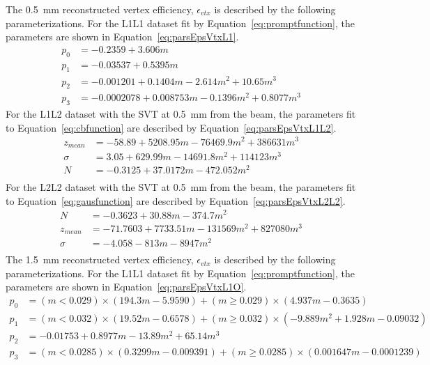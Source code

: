 The 0.5~mm reconstructed vertex efficiency, $\epsilon_{vtx}$ is described by the following parameterizations. For the L1L1 dataset fit by Equation~\eqref{eq:promptfunction}, the parameters are shown in Equation~\ref{eq:parsEpsVtxL1}.
\begin{equation}
\begin{split}
\label{eq:parsEpsVtxL1}
p_0 &= -0.2359+3.606m\\
p_1 &= -0.03537+0.5395m \\
p_2 &= -0.001201+0.1404m-2.614m^2+10.65m^3 \\
p_3 &= -0.0002078+0.008753m-0.1396m^2+0.8077m^3
\end{split}
\end{equation}
For the L1L2 dataset with the SVT at 0.5~mm from the beam, the parameters fit to Equation~\eqref{eq:cbfunction} are described by Equation~\eqref{eq:parsEpsVtxL1L2}.
\begin{equation}
\begin{split}
\label{eq:parsEpsVtxL1L2}
z_{mean} &= -58.89+5208.95m-76469.9m^2+386631m^3\\
\sigma &= 3.05+629.99m-14691.8m^2+114123m^3\\
N &= -0.3125+37.0172m-472.052m^2 \\
\end{split}
\end{equation}
For the L2L2 dataset with the SVT at 0.5~mm from the beam, the parameters fit to Equation~\eqref{eq:gausfunction} are described by Equation~\eqref{eq:parsEpsVtxL2L2}.
\begin{equation}
\begin{split}
\label{eq:parsEpsVtxL2L2}
N &= -0.3623+30.88m-374.7m^2\\
z_{mean} &= -71.7603+7733.51m-131569m^2+827080m^3\\
\sigma &= -4.058-813m-8947m^2\\
\end{split}
\end{equation}
\indent The 1.5~mm reconstructed vertex efficiency, $\epsilon_{vtx}$ is described by the following parameterizations. For the L1L1 dataset fit by Equation~\eqref{eq:promptfunction}, the parameters are shown in Equation~\ref{eq:parsEpsVtxL1O}.
\begin{equation}
\begin{split}
\label{eq:parsEpsVtxL1O}
p_0 &= (m<0.029)\times(194.3m-5.9590)+(m\geq 0.029)\times(4.937m-0.3635)\\
p_1 &= (m<0.032)\times(19.52m-0.6578)+(m\geq 0.032)\times(-9.889m^2+1.928m-0.09032)\\
p_2 &= -0.01753+0.8977m-13.89m^2+65.14m^3 \\
p_3 &= (m<0.0285)\times(0.3299m-0.009391)+(m\geq 0.0285)\times(0.001647m-0.0001239)\\
\end{split}
\end{equation}
